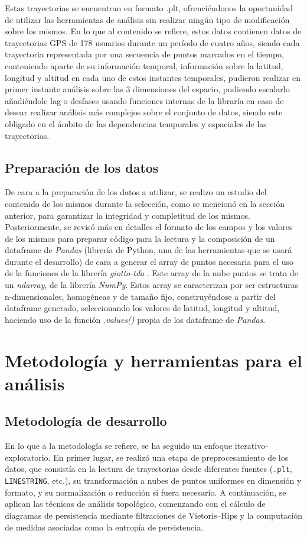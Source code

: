 Estas trayectorias se encuentran en formato .plt, ofrenciéndonos la oportunidad de utilizar las herramientas de análisis sin realizar ningún tipo de modificación sobre los mismos. En lo que al contenido se refiere, estos datos contienen datos de trayectorias GPS de 178 usuarios durante un período de cuatro años, siendo cada trayectoria representada por una secuencia de puntos marcados en el tiempo, conteniendo aparte de su información temporal, información sobre la latitud, longitud y altitud en cada uno de estos instantes temporales, pudieron realizar en primer instante análisis sobre las 3 dimensiones del espacio, pudiendo escalarlo añadiéndole lag o desfases usando funciones internas de la libraría en caso de desear realizar análisis más complejos sobre el conjunto de datos, siendo este obligado en el ámbito de las dependencias temporales y espaciales de las trayectorias. \cite{geolife1} \cite{geolife2} \cite{geolife3} 

\subsection{Preparación de los datos}

De cara a la preparación de los datos a utilizar, se realizo un estudio del contenido de los mismos durante la selección, como se mencionó en la sección anterior, para garantizar la integridad y completitud de los mismos. Posteriormente, se revisó más en detalles el formato de los campos y los valores de los mismos para preparar código para la lectura y la composición de un dataframe de \textit{Pandas} (librería de Python, una de las herramientas que se usará durante el desarrollo) de cara a generar el array de puntos necesaria para el uso de la funciones de la librería \textit{giotto-tda} \cite{Giotto-tda}. Este array de la nube puntos se trata de un \textit{ndarray}, de la librería \textit{NumPy}. Estos array se caracterizan por ser estructuras n-dimensionales, homogéneas y de tamaño fijo, construyéndose a partir del dataframe generado, seleccionando los valores de latitud, longitud y altitud, haciendo uso de la función \textit{.values()} propia de los dataframe de \textit{Pandas}.

\section{Metodología y herramientas para el análisis}

\subsection{Metodología de desarrollo}
En lo que a la metodología se refiere, se ha seguido un enfoque iterativo-exploratorio. En primer lugar, se realizó una etapa de preprocesamiento de los datos, que consistía en la lectura de trayectorias desde diferentes fuentes (\texttt{.plt}, \texttt{LINESTRING}, etc.), su transformación a nubes de puntos uniformes en dimensión y formato, y su normalización o reducción si fuera necesario. A continuación, se aplican las técnicas de análisis topológico, comenzando con el cálculo de diagramas de persistencia mediante filtraciones de Vietoris–Rips y la computación de medidas asociadas como la entropía de persistencia.

